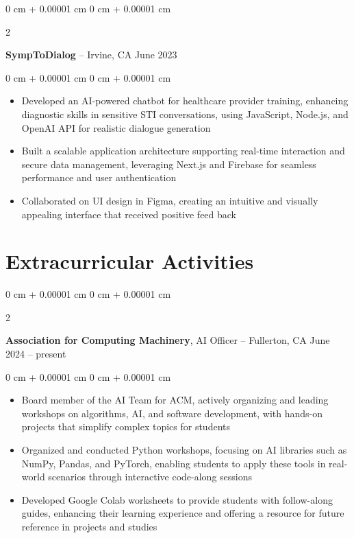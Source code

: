 \documentclass[10pt, letterpaper]{article}
\newenvironment{highlights}{
    \begin{itemize}[
        topsep=0.10 cm,
        parsep=0.10 cm,
        partopsep=0pt,
        itemsep=0pt,
        leftmargin=0 cm + 10pt
    ]
}{
    \end{itemize}
} %
\newenvironment{onecolentry}{
    \begin{adjustwidth}{
        0 cm + 0.00001 cm
    }{
        0 cm + 0.00001 cm
    }
}{
    \end{adjustwidth}
} %
\newenvironment{twocolentry}[2][]{
    \onecolentry
    \def\secondColumn{#2}
    \setcolumnwidth{\fill, 4.5 cm}
    \begin{paracol}{2}
}{
    \switchcolumn \raggedleft \secondColumn
    \end{paracol}
    \endonecolentry
} %
\begin{document}
        \vspace{0.2 cm}

        \begin{twocolentry}{
            June 2023
        }
            \textbf{SympToDialog} -- Irvine, CA\end{twocolentry}

        \vspace{0.10 cm}
        \begin{onecolentry}
            \begin{highlights}
                \item Developed an AI-powered chatbot for healthcare provider training, enhancing diagnostic skills in sensitive STI conversations, using JavaScript, Node.js, and OpenAI API for realistic dialogue generation
                \item Built a scalable application architecture supporting real-time interaction and secure data management, leveraging Next.js and Firebase for seamless performance and user authentication
                \item Collaborated on UI design in Figma, creating an intuitive and visually appealing interface that received positive feed back
            \end{highlights}
        \end{onecolentry}



    
    \section{Extracurricular Activities}



        
        \begin{twocolentry}{
            June 2024 – present
        }
            \textbf{Association for Computing Machinery}, AI Officer -- Fullerton, CA\end{twocolentry}

        \vspace{0.10 cm}
        \begin{onecolentry}
            \begin{highlights}
                \item Board member of the AI Team for ACM, actively organizing and leading workshops on algorithms, AI, and software development, with hands-on projects that simplify complex topics for students
                \item Organized and conducted Python workshops, focusing on AI libraries such as NumPy, Pandas, and PyTorch, enabling students to apply these tools in real-world scenarios through interactive code-along sessions
                \item Developed Google Colab worksheets to provide students with follow-along guides, enhancing their learning experience and offering a resource for future reference in projects and studies
            \end{highlights}
        \end{onecolentry}
\end{document}
